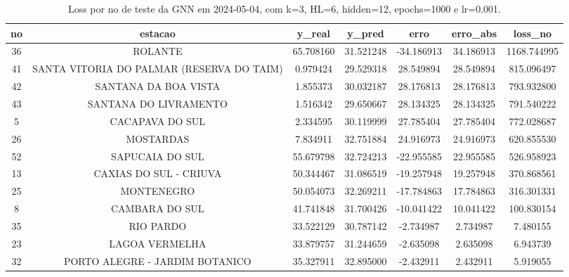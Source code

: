 \begin{table}[h]
\centering
\caption{Loss por no de teste da GNN em 2024-05-04, com k=3, HL=6, hidden=12, epochs=1000 e lr=0.001.}
\label{tab:gnn_loss_k3_hl6_h12_e1000_d20240504}
\begin{tabular}{ccccccc}
\toprule
no & estacao & y\_real & y\_pred & erro & erro\_abs & loss\_no \\
\midrule
36 & ROLANTE & 65.708160 & 31.521248 & -34.186913 & 34.186913 & 1168.744995 \\
41 & SANTA VITORIA DO PALMAR (RESERVA DO TAIM) & 0.979424 & 29.529318 & 28.549894 & 28.549894 & 815.096497 \\
42 & SANTANA DA BOA VISTA & 1.855373 & 30.032187 & 28.176813 & 28.176813 & 793.932800 \\
43 & SANTANA DO LIVRAMENTO & 1.516342 & 29.650667 & 28.134325 & 28.134325 & 791.540222 \\
5 & CACAPAVA DO SUL & 2.334595 & 30.119999 & 27.785404 & 27.785404 & 772.028687 \\
26 & MOSTARDAS & 7.834911 & 32.751884 & 24.916973 & 24.916973 & 620.855530 \\
52 & SAPUCAIA DO SUL & 55.679798 & 32.724213 & -22.955585 & 22.955585 & 526.958923 \\
13 & CAXIAS DO SUL - CRIUVA & 50.344467 & 31.086519 & -19.257948 & 19.257948 & 370.868561 \\
25 & MONTENEGRO & 50.054073 & 32.269211 & -17.784863 & 17.784863 & 316.301331 \\
8 & CAMBARA DO SUL & 41.741848 & 31.700426 & -10.041422 & 10.041422 & 100.830154 \\
35 & RIO PARDO & 33.522129 & 30.787142 & -2.734987 & 2.734987 & 7.480155 \\
23 & LAGOA VERMELHA & 33.879757 & 31.244659 & -2.635098 & 2.635098 & 6.943739 \\
32 & PORTO ALEGRE - JARDIM BOTANICO & 35.327911 & 32.895000 & -2.432911 & 2.432911 & 5.919055 \\
\bottomrule
\end{tabular}
\end{table}
